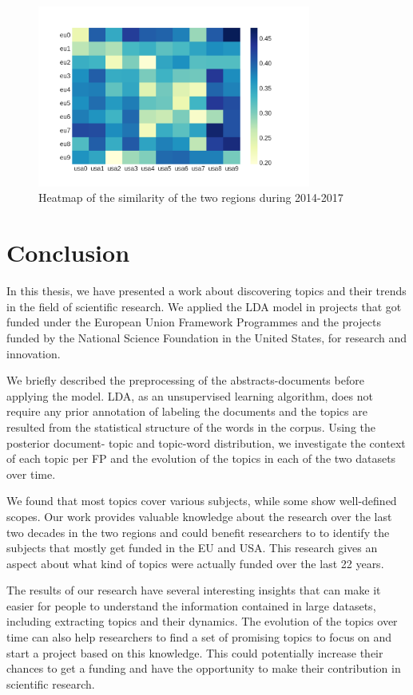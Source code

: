 \documentclass[12pt]{report}
\begin{document}
\begin{figure}
\centering
\includegraphics[width=0.8\textwidth]
{figs/heatmaps/heatmapH2020.png}
\caption{Heatmap of the similarity of the two regions during 2014-2017}
\label{heatmap20}
\end{figure}
\vfill

\section{Conclusion}
\label{conclusion}
In this thesis, we have presented a work about discovering topics and their
trends in the field of scientific research. We applied the LDA model in projects
that got funded under the European Union Framework Programmes and the projects
funded by the National Science Foundation in the United States, for research and
innovation.

We briefly described the preprocessing of the
abstracts-documents before applying the model. LDA, as an unsupervised
learning algorithm, does not require any prior annotation of labeling
the documents and the topics are resulted from the statistical
structure of the words in the corpus. Using the posterior document-
topic and topic-word distribution, we investigate the context of each
topic per FP and the evolution of the topics in each of the two
datasets over time.

We found that most topics cover various subjects, while some show 
well-defined scopes. Our work provides
valuable knowledge about the research over the last two decades in the
two regions and could benefit researchers to to identify the subjects
that mostly get funded in the EU and USA. This research gives an aspect 
about what kind of topics were actually funded over
the last 22 years.

The results of our research have several interesting insights that can make it
easier for people to understand the information contained in large datasets,
including extracting topics and their dynamics. The evolution of the topics over
time can also help researchers to find a set of promising topics to focus on and
start a project based on this knowledge. This could potentially increase their
chances to get a funding and have the opportunity to make their contribution in
scientific research.
\end{document}

